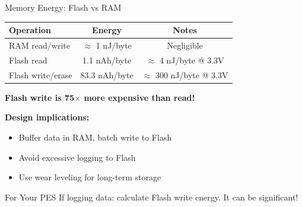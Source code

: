 \documentclass[aspectratio=169,11pt]{beamer}
\begin{document}
\begin{frame}{Memory Energy: Flash vs RAM}
    \begin{table}
        \centering
        \begin{tabular}{@{}lcc@{}}
            \toprule
            \textbf{Operation} & \textbf{Energy} & \textbf{Notes} \\
            \midrule
            RAM read/write & $\approx$ 1 nJ/byte & Negligible \\
            Flash read & 1.1 nAh/byte & $\approx$ 4 nJ/byte @ 3.3V \\
            Flash write/erase & 83.3 nAh/byte & $\approx$ 300 nJ/byte @ 3.3V \\
            \bottomrule
        \end{tabular}
    \end{table}
    
    \vspace{0.3cm}
    \textbf{Flash write is 75$\times$ more expensive than read!}
    
    \vspace{0.3cm}
    \textbf{Design implications:}
    \begin{itemize}
        \item Buffer data in RAM, batch write to Flash
        \item Avoid excessive logging to Flash
        \item Use wear leveling for long-term storage
    \end{itemize}
    
    \vspace{0.2cm}
    \begin{block}{For Your PES}
        If logging data: calculate Flash write energy. It can be significant!
    \end{block}
\end{frame}
\end{document}
